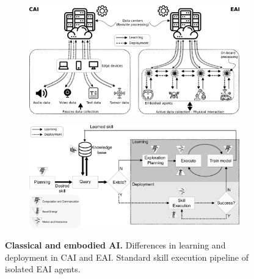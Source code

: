 \documentclass[12pt]{article}
\begin{document}
\begin{figure}[!t]
	\centering
	\hspace*{\fill}
	\begin{subfigure}[t]{0.45\textwidth}
		\subcaption{}
		\includegraphics[width= \textwidth]{cai_and_eai.png} \label{fig:cai_and_eai}
	\end{subfigure}
	\hfill
	\begin{subfigure}[t]{0.45\textwidth}
		\subcaption{}
		\includegraphics[width=\textwidth]{embodied_ai_learning_pipeline.png} \label{fig:embodied_ai_pipeline}
	\end{subfigure}	
	\hspace*{\fill}
	\caption[] {\label{fig:cai_and_eai_general} \textbf{Classical and embodied AI.}  Differences in learning and deployment in CAI and EAI.  Standard skill execution pipeline of isolated EAI agents.}
\end{figure}
\end{document}
